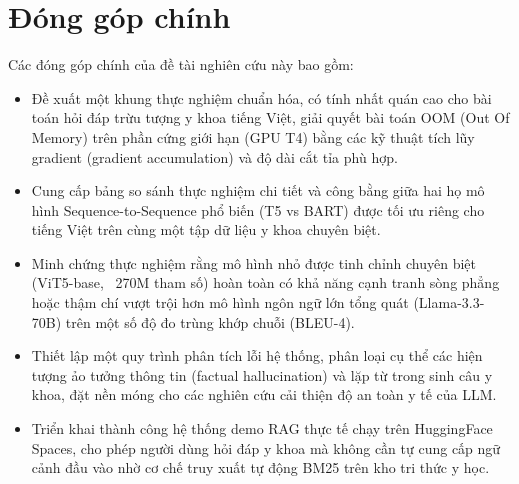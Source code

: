 \section{Đóng góp chính}
Các đóng góp chính của đề tài nghiên cứu này bao gồm:
\begin{itemize}
  \item Đề xuất một khung thực nghiệm chuẩn hóa, có tính nhất quán cao cho bài toán hỏi đáp trừu tượng y khoa tiếng Việt, giải quyết bài toán OOM (Out Of Memory) trên phần cứng giới hạn (GPU T4) bằng các kỹ thuật tích lũy gradient (gradient accumulation) và độ dài cắt tỉa phù hợp.
  \item Cung cấp bảng so sánh thực nghiệm chi tiết và công bằng giữa hai họ mô hình Sequence-to-Sequence phổ biến (T5 vs BART) được tối ưu riêng cho tiếng Việt trên cùng một tập dữ liệu y khoa chuyên biệt.
  \item Minh chứng thực nghiệm rằng mô hình nhỏ được tinh chỉnh chuyên biệt (ViT5-base, ~270M tham số) hoàn toàn có khả năng cạnh tranh sòng phẳng hoặc thậm chí vượt trội hơn mô hình ngôn ngữ lớn tổng quát (Llama-3.3-70B) trên một số độ đo trùng khớp chuỗi (BLEU-4).
  \item Thiết lập một quy trình phân tích lỗi hệ thống, phân loại cụ thể các hiện tượng ảo tưởng thông tin (factual hallucination) và lặp từ trong sinh câu y khoa, đặt nền móng cho các nghiên cứu cải thiện độ an toàn y tế của LLM.
  \item Triển khai thành công hệ thống demo RAG thực tế chạy trên HuggingFace Spaces, cho phép người dùng hỏi đáp y khoa mà không cần tự cung cấp ngữ cảnh đầu vào nhờ cơ chế truy xuất tự động BM25 trên kho tri thức y học.
\end{itemize}